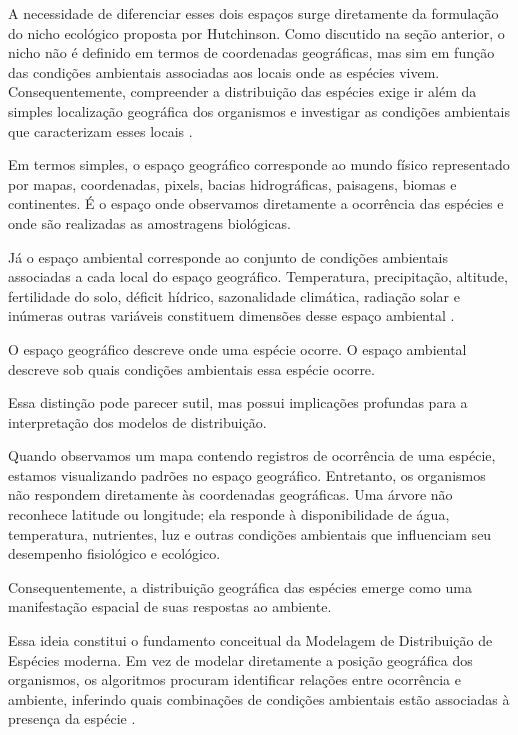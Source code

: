 A necessidade de diferenciar esses dois espaços surge diretamente da formulação do nicho ecológico proposta por Hutchinson. Como discutido na seção anterior, o nicho não é definido em termos de coordenadas geográficas, mas sim em função das condições ambientais associadas aos locais onde as espécies vivem. Consequentemente, compreender a distribuição das espécies exige ir além da simples localização geográfica dos organismos e investigar as condições ambientais que caracterizam esses locais \parencite{hutchinson1957,soberon2007}.

Em termos simples, o espaço geográfico corresponde ao mundo físico representado por mapas, coordenadas, pixels, bacias hidrográficas, paisagens, biomas e continentes. É o espaço onde observamos diretamente a ocorrência das espécies e onde são realizadas as amostragens biológicas.

Já o espaço ambiental corresponde ao conjunto de condições ambientais associadas a cada local do espaço geográfico. Temperatura, precipitação, altitude, fertilidade do solo, déficit hídrico, sazonalidade climática, radiação solar e inúmeras outras variáveis constituem dimensões desse espaço ambiental \parencite{franklin2010}.

\begin{conceito}
	O espaço geográfico descreve onde uma espécie ocorre. O espaço ambiental descreve sob quais condições ambientais essa espécie ocorre.
\end{conceito}

Essa distinção pode parecer sutil, mas possui implicações profundas para a interpretação dos modelos de distribuição.

Quando observamos um mapa contendo registros de ocorrência de uma espécie, estamos visualizando padrões no espaço geográfico. Entretanto, os organismos não respondem diretamente às coordenadas geográficas. Uma árvore não reconhece latitude ou longitude; ela responde à disponibilidade de água, temperatura, nutrientes, luz e outras condições ambientais que influenciam seu desempenho fisiológico e ecológico.

Consequentemente, a distribuição geográfica das espécies emerge como uma manifestação espacial de suas respostas ao ambiente.

Essa ideia constitui o fundamento conceitual da Modelagem de Distribuição de Espécies moderna. Em vez de modelar diretamente a posição geográfica dos organismos, os algoritmos procuram identificar relações entre ocorrência e ambiente, inferindo quais combinações de condições ambientais estão associadas à presença da espécie \parencite{guisan2005predicting,elith2009}.

